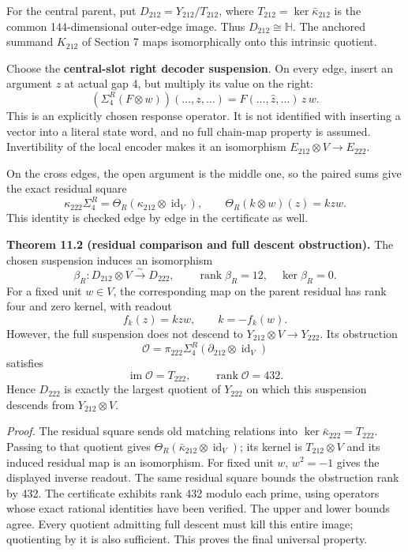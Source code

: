 \documentclass[
  11pt,
  a4paper,
]{article}
\begin{document}
For the central parent, put \(D_{212}=Y_{212}/T_{212}\), where
\(T_{212}=\ker\bar\kappa_{212}\) is the common 144-dimensional
outer-edge image. Thus \(D_{212}\cong\mathbb H\). The anchored summand
\(K_{212}\) of Section 7 maps isomorphically onto this intrinsic
quotient.

Choose the \textbf{central-slot right decoder suspension}. On every
edge, insert an argument \(z\) at actual gap 4, but multiply its value
on the right: \[
 (\Sigma_4^R(F\otimes w))(\ldots,z,\ldots)
       =F(\ldots,\widehat z,\ldots)\,z\,w.
\] This is an explicitly chosen response operator. It is not identified
with inserting a vector into a literal state word, and no full chain-map
property is assumed. Invertibility of the local encoder makes it an
isomorphism \(E_{212}\otimes V\to E_{222}\).

On the cross edges, the open argument is the middle one, so the paired
sums give the exact residual square \[
 \boxed{\kappa_{222}\Sigma_4^R
 =\Theta_R(\kappa_{212}\otimes\operatorname{id}_V),
 \qquad \Theta_R(k\otimes w)(z)=kzw.}
\] This identity is checked edge by edge in the certificate as well.

\textbf{Theorem 11.2 (residual comparison and full descent
obstruction).} The chosen suspension induces an isomorphism \[
 \beta_R:D_{212}\otimes V\xrightarrow{\sim}D_{222},
 \qquad\operatorname{rank}\beta_R=12,\quad\ker\beta_R=0.
\] For a fixed unit \(w\in V\), the corresponding map on the parent
residual has rank four and zero kernel, with readout \[
 f_k(z)=kzw,\qquad k=-f_k(w).
\] However, the full suspension does not descend to
\(Y_{212}\otimes V\to Y_{222}\). Its obstruction \[
 \mathcal O=\pi_{222}\Sigma_4^R
            (\partial_{212}\otimes\operatorname{id}_V)
\] satisfies \[
 \boxed{\operatorname{im}\mathcal O=T_{222},
        \qquad\operatorname{rank}\mathcal O=432.}
\] Hence \(D_{222}\) is exactly the largest quotient of \(Y_{222}\) on
which this suspension descends from \(Y_{212}\otimes V\).

\emph{Proof.} The residual square sends old matching relations into
\(\ker\bar\kappa_{222}=T_{222}\). Passing to that quotient gives
\(\Theta_R(\bar\kappa_{212}\otimes\operatorname{id}_V)\); its kernel is
\(T_{212}\otimes V\) and its induced residual map is an isomorphism. For
fixed unit \(w\), \(w^2=-1\) gives the displayed inverse readout. The
same residual square bounds the obstruction rank by 432. The certificate
exhibits rank 432 modulo each prime, using operators whose exact
rational identities have been verified. The upper and lower bounds
agree. Every quotient admitting full descent must kill this entire
image; quotienting by it is also sufficient. This proves the final
universal property.
\end{document}
